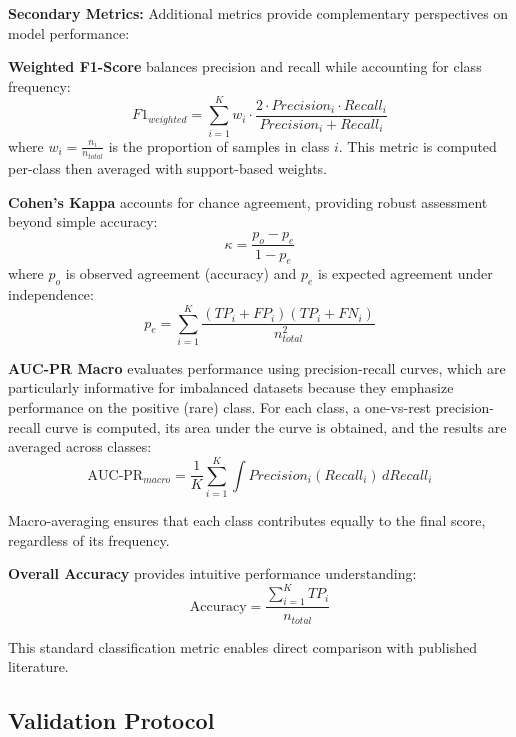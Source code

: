 \textbf{Secondary Metrics:} Additional metrics provide complementary perspectives on model performance:

\textbf{Weighted F1-Score} balances precision and recall while accounting for class frequency:
\begin{equation}
F1_{weighted} = \sum_{i=1}^{K} w_i \cdot \frac{2 \cdot Precision_i \cdot Recall_i}{Precision_i + Recall_i}
\end{equation}
where $w_i = \frac{n_i}{n_{total}}$ is the proportion of samples in class $i$. This metric is computed per-class then averaged with support-based weights.

\textbf{Cohen's Kappa} accounts for chance agreement, providing robust assessment beyond simple accuracy:
\begin{equation}
\kappa = \frac{p_o - p_e}{1 - p_e}
\end{equation}
where $p_o$ is observed agreement (accuracy) and $p_e$ is expected agreement under independence:
\begin{equation}
p_e = \sum_{i=1}^{K} \frac{(TP_i + FP_i)(TP_i + FN_i)}{n_{total}^2}
\end{equation}

\textbf{AUC-PR Macro} evaluates performance using precision-recall curves, which are particularly informative for imbalanced datasets because they emphasize performance on the positive (rare) class. For each class, a one-vs-rest precision-recall curve is computed, its area under the curve is obtained, and the results are averaged across classes:
\begin{equation}
\text{AUC-PR}_{macro} = \frac{1}{K} \sum_{i=1}^{K} \int Precision_i(Recall_i) \, dRecall_i
\end{equation}

Macro-averaging ensures that each class contributes equally to the final score, regardless of its frequency.

\textbf{Overall Accuracy} provides intuitive performance understanding:
\begin{equation}
\text{Accuracy} = \frac{\sum_{i=1}^{K} TP_i}{n_{total}}
\end{equation}

This standard classification metric enables direct comparison with published literature.

\subsection{Validation Protocol}
\label{sec:validation_protocol}

